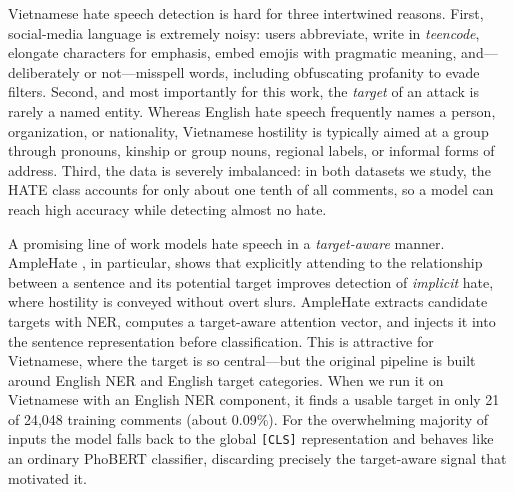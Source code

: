 \documentclass[11pt]{article}
\begin{document}
Vietnamese hate speech detection is hard for three intertwined reasons. First, social-media language is extremely noisy: users abbreviate, write in \emph{teencode}, elongate characters for emphasis, embed emojis with pragmatic meaning, and---deliberately or not---misspell words, including obfuscating profanity to evade filters. Second, and most importantly for this work, the \emph{target} of an attack is rarely a named entity. Whereas English hate speech frequently names a person, organization, or nationality, Vietnamese hostility is typically aimed at a group through pronouns, kinship or group nouns, regional labels, or informal forms of address. Third, the data is severely imbalanced: in both datasets we study, the HATE class accounts for only about one tenth of all comments, so a model can reach high accuracy while detecting almost no hate.

A promising line of work models hate speech in a \emph{target-aware} manner. AmpleHate \citep{amplehate}, in particular, shows that explicitly attending to the relationship between a sentence and its potential target improves detection of \emph{implicit} hate, where hostility is conveyed without overt slurs. AmpleHate extracts candidate targets with NER, computes a target-aware attention vector, and injects it into the sentence representation before classification. This is attractive for Vietnamese, where the target is so central---but the original pipeline is built around English NER and English target categories. When we run it on Vietnamese with an English NER component, it finds a usable target in only 21 of 24{,}048 training comments (about 0.09\%). For the overwhelming majority of inputs the model falls back to the global \texttt{[CLS]} representation and behaves like an ordinary PhoBERT classifier, discarding precisely the target-aware signal that motivated it.
\end{document}
